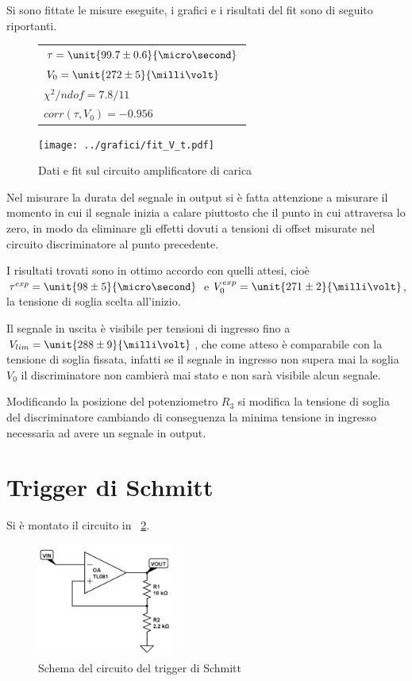 \documentclass[10pt,a4paper]{article}
\begin{document}
Si sono fittate le misure eseguite, i grafici e i risultati del fit sono di seguito riportanti.

\begin{figure}[H]
	\begin{minipage}{0.28\textwidth}
		\centering
		\begin{tabular}{l}
			$\tau = \unit{99.7 \pm 0.6}{\micro\second}$ \\
			$V_0 = \unit{272 \pm 5}{\milli \volt}$ \\
			$\chi^2 / ndof = 7.8/11$\\
			$corr(\tau,V_0) = -0.956$\\
		\end{tabular}
	\end{minipage}
	\begin{minipage}{0.75\textwidth}
		\centering
		\texttt{[image: ../grafici/fit\_V\_t.pdf]}
		\caption{Dati e fit sul circuito amplificatore di carica}
		\label{}
	\end{minipage}
\end{figure}

Nel misurare la durata del segnale in output si è fatta attenzione a misurare il momento in cui il segnale inizia a calare piuttosto che il punto in cui attraversa lo zero, in modo da eliminare gli effetti dovuti a tensioni di offset misurate nel circuito discriminatore al punto precedente.

I risultati trovati sono in ottimo accordo con quelli attesi, cioè $\tau^{exp} = \unit{98 \pm 5}{\micro\second}$ e $V_0^{exp} = \unit{271 \pm 2}{\milli\volt}$, la tensione di soglia scelta all'inizio.

Il segnale in uscita è visibile per tensioni di ingresso fino a $V_{lim} = \unit{288 \pm 9}{\milli\volt}$, che come atteso è comparabile con la tensione di soglia fissata, infatti se il segnale in ingresso non supera mai la soglia $V_0$ il discriminatore non cambierà mai stato e non sarà visibile alcun segnale.

Modificando la posizione del potenziometro $R_3$ si modifica la tensione di soglia del discriminatore cambiando di conseguenza la minima tensione in ingresso necessaria ad avere un segnale in output.

\section{Trigger di Schmitt}
Si è montato il circuito in \figurename{~\ref{fig:schmitt_trigger}}.

\begin{figure}[H]
	\centering
	\includegraphics[width=0.40\textwidth]{../circuiti/schmitt_trigger.jpg}
	\caption{Schema del circuito del trigger di Schmitt}
	\label{fig:schmitt_trigger}
\end{figure}
\end{document}

